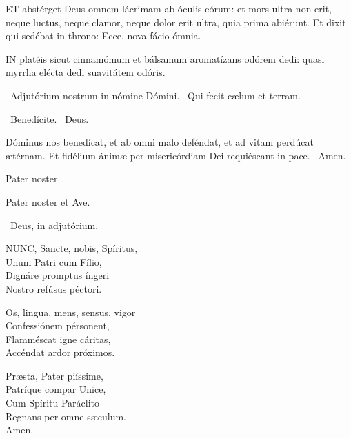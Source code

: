 
\lettrine[lines=2]{E}{T} abstérget Deus omnem lácrimam ab óculis eórum: et mors ultra non erit, neque luctus, neque clamor, neque dolor erit ultra, quia prima abiérunt. Et dixit qui sedébat in throno: Ecce, nova fácio ómnia.


\lettrine[lines=2]{I}{N} platéis sicut cinnamómum et bálsamum aromatízans odórem dedi: quasi myrrha elécta dedi suavitátem odóris.

\V\ Adjutórium nostrum in nómine Dómini. \R\ Qui fecit cælum et terram.

\V\ Benedícite. \R\ Deus.

 Dóminus nos benedícat, et ab omni malo deféndat, et ad vitam perdúcat ætérnam. Et fidélium ánimæ per misericórdiam Dei requiéscant in pace. \R\ Amen.

 Pater noster 


Pater noster et Ave.

\V\ Deus, in adjutórium.


\lettrine[lines=2]{N}{UNC}, Sancte, nobis, Spíritus,\\
Unum Patri cum Fílio,\\
Dignáre promptus íngeri\\
Nostro refúsus péctori.

Os, lingua, mens, sensus, vigor\\
Confessiónem pérsonent,\\
Flamméscat igne cáritas,\\
Accéndat ardor próximos.

Præsta, Pater piíssime,\\
Patríque compar Unice,\\
Cum Spíritu Paráclito\\
Regnans per omne sæculum.\\
Amen.

